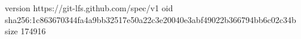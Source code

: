 version https://git-lfs.github.com/spec/v1
oid sha256:1c863670344fa4a9bb32517e50a22c3e20040e3abf49022b366794bb6c02c34b
size 174916
